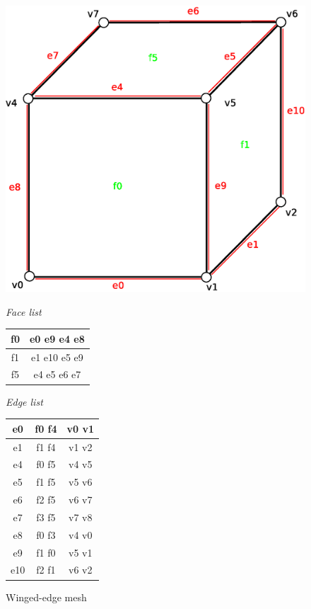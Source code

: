\begin{figure}[!htbp]
\label{fig:winged_edge_mesh}

\begin{minipage}[!htbp]{0.65\linewidth}
\centering
\includegraphics[width=0.6\linewidth]{../img/we_rep_mesh.eps}
\label{fig:figure1}
\end{minipage}
\hspace{0.5cm}
\begin{minipage}[!htbp]{0.25\linewidth}
\centering

\emph{Face list}
\vspace{1mm}

\begin{tabular}{|c|c|}
\hline
\textsf{f0} & \textsf{e0 e9 e4 e8}\\
\hline
\textsf{f1} & \textsf{e1 e10 e5 e9}\\
\hline
\textsf{f5} & \textsf{e4 e5 e6 e7}\\
\hline
\end{tabular}

\vspace{10mm}
\emph{Edge list}
\vspace{1mm}

\begin{tabular}{|c|c|c|}
\hline
\textsf{e0} & \textsf{f0 f4} & \textsf{v0 v1}\\
\hline
\textsf{e1} & \textsf{f1 f4} & \textsf{v1 v2}\\
\hline
\textsf{e4} & \textsf{f0 f5} & \textsf{v4 v5}\\
\hline
\textsf{e5} & \textsf{f1 f5} & \textsf{v5 v6}\\
\hline
\textsf{e6} & \textsf{f2 f5} & \textsf{v6 v7}\\
\hline
\textsf{e7} & \textsf{f3 f5} & \textsf{v7 v8}\\
\hline
\textsf{e8} & \textsf{f0 f3} & \textsf{v4 v0}\\
\hline
\textsf{e9} & \textsf{f1 f0} & \textsf{v5 v1}\\
\hline
\textsf{e10} & \textsf{f2 f1} & \textsf{v6 v2}\\
\hline
\end{tabular}

\label{fig:figure2}
\end{minipage}

\caption{Winged-edge mesh}
\end{figure}


